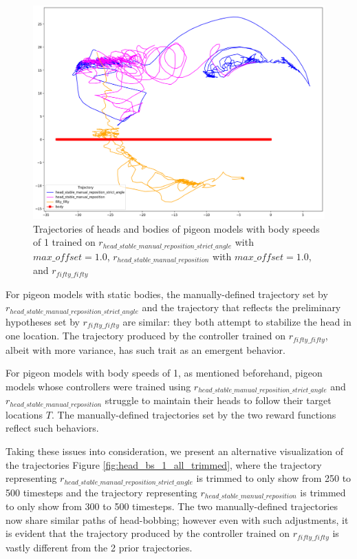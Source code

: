   \begin{figure}[H]
      \centering
      \includegraphics[width=1\textwidth]{figures/head_tracking_results/pigeon_bs_1_all.png}
      \caption{Trajectories of heads and bodies of pigeon models with body speeds of 1 trained on $r_{head\_stable\_manual\_reposition\_strict\_angle}$ with $max\_offset = 1.0$, $r_{head\_stable\_manual\_reposition}$ with $max\_offset = 1.0$, and $r_{fifty\_fifty}$}
      \label{fig:head_bs_1_all}
  \end{figure}

  For pigeon models with static bodies, the manually-defined trajectory set by $r_{head\_stable\_manual\_reposition\_strict\_angle}$ and the trajectory that reflects the preliminary hypotheses set by $r_{fifty\_fifty}$ are similar: they both attempt to stabilize the head in one location. The trajectory produced by the controller trained on $r_{fifty\_fifty}$, albeit with more variance, has such trait as an emergent behavior.

  For pigeon models with body speeds of 1, as mentioned beforehand, pigeon models whose controllers were trained using $r_{head\_stable\_manual\_reposition\_strict\_angle}$ and $r_{head\_stable\_manual\_reposition}$ struggle to maintain their heads to follow their target locations $T$.
  The manually-defined trajectories set by the two reward functions reflect such behaviors.

  Taking these issues into consideration, we present an alternative visualization of the trajectories Figure \ref{fig:head_bs_1_all_trimmed}, where the trajectory representing $r_{head\_stable\_manual\_reposition\_strict\_angle}$ is trimmed to only show from 250 to 500 timesteps and the trajectory representing $r_{head\_stable\_manual\_reposition}$ is trimmed to only show from 300 to 500 timesteps.
  The two manually-defined trajectories now share similar paths of head-bobbing; however even with such adjustments, it is evident that the trajectory produced by the controller trained on $r_{fifty\_fifty}$ is vastly different from the 2 prior trajectories.


